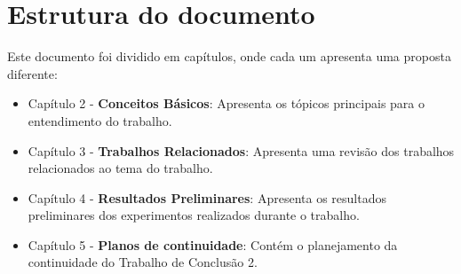 \section{Estrutura do documento}
Este documento foi dividido em capítulos, onde cada um apresenta uma proposta diferente:
\begin{itemize}
	\item Capítulo 2 - \textbf{Conceitos Básicos}: Apresenta os tópicos principais para o entendimento
		do trabalho.
	\item Capítulo 3 - \textbf{Trabalhos Relacionados}: Apresenta uma revisão dos trabalhos
		relacionados ao tema do trabalho.
	\item Capítulo 4 - \textbf{Resultados Preliminares}: Apresenta os resultados preliminares dos
		experimentos realizados durante o trabalho.
	\item Capítulo 5 - \textbf{Planos de continuidade}: Contém o planejamento da continuidade do
		Trabalho de Conclusão 2.
\end{itemize}
